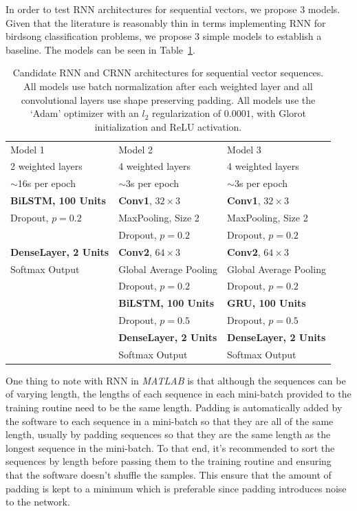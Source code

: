 In order to test RNN architectures for sequential vectors, we propose 3 models.
Given that the literature is reasonably thin in terms implementing RNN for
birdsong classification problems, we propose 3 simple models to establish a
baseline. The models can be seen in Table~\ref{table:rnn_seq_vector}.

\begin{table}[h!t]
\begin{center}
\begin{tabular}{l l l}
\toprule
Model 1 & Model 2 & Model 3 \\ [0.5ex]
2 weighted layers & 4 weighted layers & 4 weighted layers \\[0.5ex]
$\sim$16s per epoch & $\sim$3s per epoch & $\sim$3s per epoch \\[0.5ex]
\midrule
\textbf{BiLSTM, 100 Units} & \textbf{Conv1}, $32 \times 3$ & \textbf{Conv1}, $32 \times 3$ \\
Dropout, $p=0.2$ & MaxPooling, Size 2 & MaxPooling, Size 2 \\
& Dropout, $p=0.2$ & Dropout, $p=0.2$ \\[1ex]
\textbf{DenseLayer, 2 Units} & \textbf{Conv2}, $64 \times 3$ & \textbf{Conv2}, $64 \times 3$ \\
Softmax Output & Global Average Pooling & Global Average Pooling \\
& Dropout, $p=0.2$ & Dropout, $p=0.2$ \\[1ex]
& \textbf{BiLSTM, 100 Units} & \textbf{GRU, 100 Units} \\
& Dropout, $p=0.5$  & Dropout, $p=0.5$  \\[1ex]
& \textbf{DenseLayer, 2 Units} & \textbf{DenseLayer, 2 Units} \\
& Softmax Output & Softmax Output \\
\bottomrule
\end{tabular}
\caption{Candidate RNN and CRNN architectures for sequential vector sequences.
  All models use batch normalization after each weighted layer and all
convolutional layers use shape preserving padding. All models use the `Adam'
optimizer with an $l_2$ regularization of $0.0001$, with Glorot initialization
and ReLU activation.}\label{table:rnn_seq_vector}
\end{center}
\end{table}

One thing to note with RNN in \textit{MATLAB} is that although the sequences can
be of varying length, the lengths of each sequence in each mini-batch provided
to the training routine need to be the same length. Padding is automatically
added by the software to each sequence in a mini-batch so that they are all of
the same length, usually by padding sequences so that they are the same length
as the longest sequence in the mini-batch. To that end, it's recommended to sort
the sequences by length before passing them to the training routine and ensuring
that the software doesn't shuffle the samples. This ensure that the amount of
padding is kept to a minimum which is preferable since padding introduces noise
to the network.

